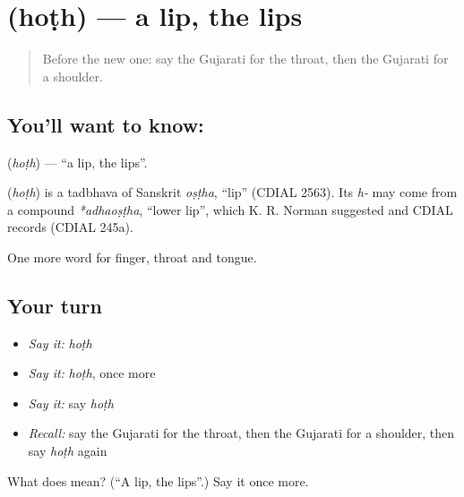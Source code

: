 \section[\texorpdfstring{\gu{હોઠ} (hoṭh)}{હોઠ (hoṭh)}]{ (hoṭh) — a lip, the lips}

\label{lesson:GU-C47-lip}



\begin{quote}
Before the new one: say the Gujarati for the throat, then the Gujarati for a shoulder.
\end{quote}

\subsection*{You'll want to know: }
\textbf{} (\emph{hoṭh}) — \textquotedblleft{}a lip, the lips\textquotedblright{}.

\begin{cousinweb}
\textbf{} (\emph{hoṭh}) is a tadbhava of Sanskrit \emph{oṣṭha}, \textquotedblleft{}lip\textquotedblright{} (CDIAL 2563). Its \emph{h-} may come from a compound \emph{*adhaoṣṭha}, \textquotedblleft{}lower lip\textquotedblright{}, which K. R. Norman suggested and CDIAL records (CDIAL 245a).
\end{cousinweb}

\begin{grammarlens}[title={What you've built}]
One more word for finger, throat and tongue.
\end{grammarlens}

\subsection*{Your turn}
\begin{itemize}
\raggedright
  \item \emph{Say it:} \emph{hoṭh}
  \item \emph{Say it:} \emph{hoṭh}, once more
  \item \emph{Say it:} say \emph{hoṭh}
  \item \emph{Recall:} say the Gujarati for the throat, then the Gujarati for a shoulder, then say \emph{hoṭh} again
\end{itemize}

\begin{tcolorbox}[breakable,colback=teal!4,colframe=teal!35!black,title={Before you move on}]
What does  mean? (\textquotedblleft{}A lip, the lips\textquotedblright{}.) Say it once more.
\end{tcolorbox}
